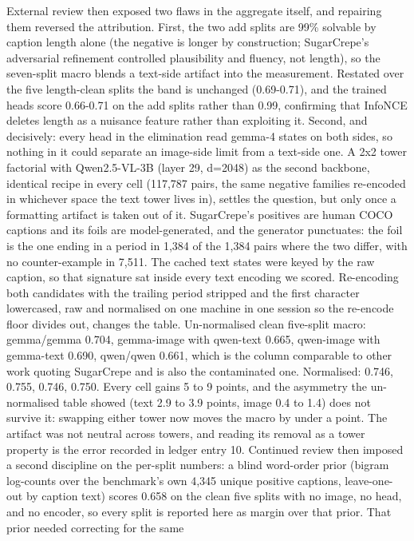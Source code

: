 \documentclass[
  11pt,
]{article}
\begin{document}
External review then exposed two flaws in the aggregate itself, and
repairing them reversed the attribution. First, the two add splits are
99\% solvable by caption length alone (the negative is longer by
construction; SugarCrepe's adversarial refinement controlled
plausibility and fluency, not length), so the seven-split macro blends a
text-side artifact into the measurement. Restated over the five
length-clean splits the band is unchanged (0.69-0.71), and the trained
heads score 0.66-0.71 on the add splits rather than 0.99, confirming
that InfoNCE deletes length as a nuisance feature rather than exploiting
it. Second, and decisively: every head in the elimination read gemma-4
states on both sides, so nothing in it could separate an image-side
limit from a text-side one. A 2x2 tower factorial with Qwen2.5-VL-3B
(layer 29, d=2048) as the second backbone, identical recipe in every
cell (117,787 pairs, the same negative families re-encoded in whichever
space the text tower lives in), settles the question, but only once a
formatting artifact is taken out of it. SugarCrepe's positives are human
COCO captions and its foils are model-generated, and the generator
punctuates: the foil is the one ending in a period in 1,384 of the 1,384
pairs where the two differ, with no counter-example in 7,511. The cached
text states were keyed by the raw caption, so that signature sat inside
every text encoding we scored. Re-encoding both candidates with the
trailing period stripped and the first character lowercased, raw and
normalised on one machine in one session so the re-encode floor divides
out, changes the table. Un-normalised clean five-split macro:
gemma/gemma 0.704, gemma-image with qwen-text 0.665, qwen-image with
gemma-text 0.690, qwen/qwen 0.661, which is the column comparable to
other work quoting SugarCrepe and is also the contaminated one.
Normalised: 0.746, 0.755, 0.746, 0.750. Every cell gains 5 to 9 points,
and the asymmetry the un-normalised table showed (text 2.9 to 3.9
points, image 0.4 to 1.4) does not survive it: swapping either tower now
moves the macro by under a point. The artifact was not neutral across
towers, and reading its removal as a tower property is the error
recorded in ledger entry 10. Continued review then imposed a second
discipline on the per-split numbers: a blind word-order prior (bigram
log-counts over the benchmark's own 4,345 unique positive captions,
leave-one-out by caption text) scores 0.658 on the clean five splits
with no image, no head, and no encoder, so every split is reported here
as margin over that prior. That prior needed correcting for the same
\end{document}

